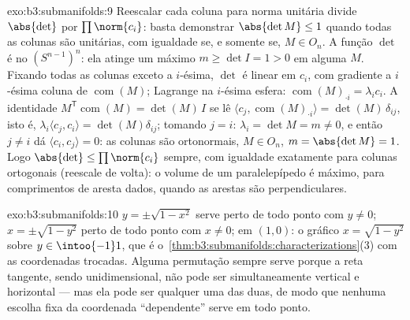 \begin{solution}{exo:b3:submanifolds:9}
Reescalar cada coluna para norma unitária divide $\abs{\det}$ por
$\prod\norm{c_i}$: basta demonstrar $\abs{\det M} \leq 1$
quando todas as colunas são unitárias, com igualdade se, e somente se, $M \in O_n$. A
função $\det$ é  no 
$(S^{n-1})^n$: ela atinge um máximo $m \geq \det I = 1 > 0$
em alguma $M$. Fixando todas as colunas exceto a $i$-ésima, $\det$ é
linear em $c_i$, com gradiente a $i$-ésima coluna de
$\operatorname{com}(M)$; Lagrange na $i$-ésima esfera:
$\operatorname{com}(M)_{\cdot i} = \lambda_i c_i$. A
identidade $M^{\mathsf T}\operatorname{com}(M) = \det(M)\,I$
se lê $\langle c_j, \operatorname{com}(M)_{\cdot i}\rangle =
\det(M)\,\delta_{ij}$, isto é, $\lambda_i\langle c_j,
c_i\rangle = \det(M)\delta_{ij}$; tomando $j = i$: $\lambda_i
= \det M = m \neq 0$, e então $j \neq i$ dá $\langle c_i,
c_j\rangle = 0$: as colunas são ortonormais, $M \in O_n$,
$m = \abs{\det M} = 1$. Logo $\abs{\det} \leq
\prod\norm{c_i}$ sempre, com igualdade exatamente para colunas
ortogonais (reescale de volta): o volume de um paralelepípedo é máximo,
para comprimentos de aresta dados, quando as arestas são perpendiculares.
\end{solution}

\begin{solution}{exo:b3:submanifolds:10}
$y = \pm\sqrt{1 - x^2}$ serve perto de todo ponto com $y \neq
0$; $x = \pm\sqrt{1 - y^2}$ perto de todo ponto com $x \neq 0$;
em $(1, 0)$: o gráfico $x = \sqrt{1 - y^2}$ sobre $y \in
\intoo{-1}1$, que é
o~\cref{thm:b3:submanifolds:characterizations}(3) com as
coordenadas trocadas. Alguma permutação sempre serve porque
a reta tangente, sendo unidimensional, não pode ser
simultaneamente vertical e horizontal --- mas ela pode ser
qualquer uma das duas, de modo que nenhuma escolha fixa da coordenada ``dependente''
serve em todo ponto.
\end{solution}

